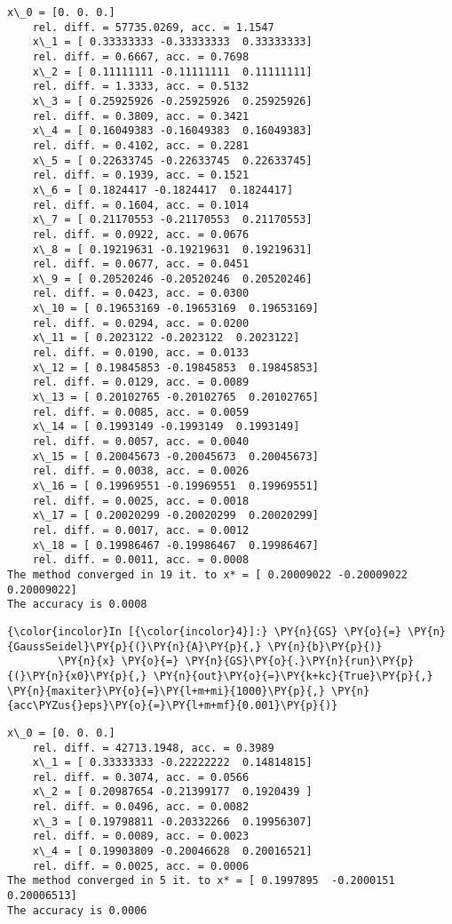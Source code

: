     \begin{Verbatim}[commandchars=\\\{\}]
	x\_0 = [0. 0. 0.]
	rel. diff. = 57735.0269, acc. = 1.1547
	x\_1 = [ 0.33333333 -0.33333333  0.33333333]
	rel. diff. = 0.6667, acc. = 0.7698
	x\_2 = [ 0.11111111 -0.11111111  0.11111111]
	rel. diff. = 1.3333, acc. = 0.5132
	x\_3 = [ 0.25925926 -0.25925926  0.25925926]
	rel. diff. = 0.3809, acc. = 0.3421
	x\_4 = [ 0.16049383 -0.16049383  0.16049383]
	rel. diff. = 0.4102, acc. = 0.2281
	x\_5 = [ 0.22633745 -0.22633745  0.22633745]
	rel. diff. = 0.1939, acc. = 0.1521
	x\_6 = [ 0.1824417 -0.1824417  0.1824417]
	rel. diff. = 0.1604, acc. = 0.1014
	x\_7 = [ 0.21170553 -0.21170553  0.21170553]
	rel. diff. = 0.0922, acc. = 0.0676
	x\_8 = [ 0.19219631 -0.19219631  0.19219631]
	rel. diff. = 0.0677, acc. = 0.0451
	x\_9 = [ 0.20520246 -0.20520246  0.20520246]
	rel. diff. = 0.0423, acc. = 0.0300
	x\_10 = [ 0.19653169 -0.19653169  0.19653169]
	rel. diff. = 0.0294, acc. = 0.0200
	x\_11 = [ 0.2023122 -0.2023122  0.2023122]
	rel. diff. = 0.0190, acc. = 0.0133
	x\_12 = [ 0.19845853 -0.19845853  0.19845853]
	rel. diff. = 0.0129, acc. = 0.0089
	x\_13 = [ 0.20102765 -0.20102765  0.20102765]
	rel. diff. = 0.0085, acc. = 0.0059
	x\_14 = [ 0.1993149 -0.1993149  0.1993149]
	rel. diff. = 0.0057, acc. = 0.0040
	x\_15 = [ 0.20045673 -0.20045673  0.20045673]
	rel. diff. = 0.0038, acc. = 0.0026
	x\_16 = [ 0.19969551 -0.19969551  0.19969551]
	rel. diff. = 0.0025, acc. = 0.0018
	x\_17 = [ 0.20020299 -0.20020299  0.20020299]
	rel. diff. = 0.0017, acc. = 0.0012
	x\_18 = [ 0.19986467 -0.19986467  0.19986467]
	rel. diff. = 0.0011, acc. = 0.0008
The method converged in 19 it. to x* = [ 0.20009022 -0.20009022  0.20009022]
The accuracy is 0.0008

    \end{Verbatim}

    \begin{Verbatim}[commandchars=\\\{\}]
{\color{incolor}In [{\color{incolor}4}]:} \PY{n}{GS} \PY{o}{=} \PY{n}{GaussSeidel}\PY{p}{(}\PY{n}{A}\PY{p}{,} \PY{n}{b}\PY{p}{)}
        \PY{n}{x} \PY{o}{=} \PY{n}{GS}\PY{o}{.}\PY{n}{run}\PY{p}{(}\PY{n}{x0}\PY{p}{,} \PY{n}{out}\PY{o}{=}\PY{k+kc}{True}\PY{p}{,} \PY{n}{maxiter}\PY{o}{=}\PY{l+m+mi}{1000}\PY{p}{,} \PY{n}{acc\PYZus{}eps}\PY{o}{=}\PY{l+m+mf}{0.001}\PY{p}{)}
\end{Verbatim}

    \begin{Verbatim}[commandchars=\\\{\}]
	x\_0 = [0. 0. 0.]
	rel. diff. = 42713.1948, acc. = 0.3989
	x\_1 = [ 0.33333333 -0.22222222  0.14814815]
	rel. diff. = 0.3074, acc. = 0.0566
	x\_2 = [ 0.20987654 -0.21399177  0.1920439 ]
	rel. diff. = 0.0496, acc. = 0.0082
	x\_3 = [ 0.19798811 -0.20332266  0.19956307]
	rel. diff. = 0.0089, acc. = 0.0023
	x\_4 = [ 0.19903809 -0.20046628  0.20016521]
	rel. diff. = 0.0025, acc. = 0.0006
The method converged in 5 it. to x* = [ 0.1997895  -0.2000151   0.20006513]
The accuracy is 0.0006

    \end{Verbatim}